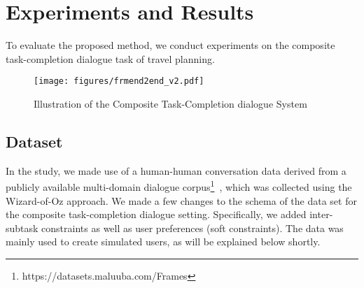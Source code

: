 \documentclass[11pt,letterpaper]{article}
\begin{document}
\section{Experiments and Results}
To evaluate the proposed method, we conduct experiments on the composite task-completion dialogue task of travel planning.

\begin{figure*}[htb] \centering  
\texttt{[image: figures/frmend2end\_v2.pdf]}
\caption{Illustration of the Composite Task-Completion dialogue System %
} 
\label{fig:dialog_framework} 
\end{figure*}


\subsection{Dataset}
\label{sec:dataset}

In the study, we made use of a human-human conversation data derived from a publicly available multi-domain dialogue corpus\footnote{https://datasets.maluuba.com/Frames}~\cite{elframes}, which was collected using the Wizard-of-Oz approach. We made a few changes to the schema of the data set for the composite task-completion dialogue setting. Specifically, we added inter-subtask constraints as well as user preferences (soft constraints). The data was mainly used to create simulated users, as will be explained below shortly. 
\end{document}

